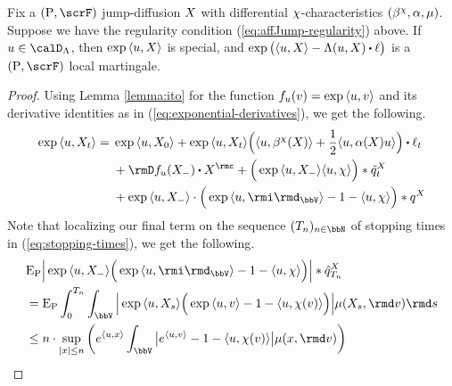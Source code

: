 \begin{proposition}
  \label{proposition:LK-real}
  Fix a $(\Prb, \scrF)$ jump-diffusion $X$ with differential $\chi$-characteristics $(\beta^\chi, \alpha, \mu)$.
  Suppose we have the regularity condition (\ref{eq:affJump-regularity}) above.
  If $\momentVar \in \odeSpace$, then $\exp{\langle u, X\rangle}$ is special, and $\exp\big( \prj\momentVar\X - \ode(\momentVar, \X) \shortInt \leb \big)$ is a $(\Prb, \scrF)$ local martingale.
\end{proposition}
\begin{proof}
  \label{proposition:LK-real}
  Using Lemma \ref{lemma:ito} for the function $f_u(v) = \exp{\langle u, v\rangle}$ and its derivative identities as in (\ref{eq:exponential-derivatives}), we get the following.
  \begin{equation}
    \label{eq:LK-ito-pause}
    \exp\prj{\momentVar}{\X_t}
    = \begin{aligned}[t]
      &\exp\prj{\momentVar}{\X_0} + \exp\prj{\momentVar}{\X_t} \Big( \prj{\momentVar}{\affDrift^\trunc(\X)} + \frac12 \prj{\momentVar}{\affDiff(\X)\momentVar} \Big) \shortInt \leb_t \\
      &+ \Der f_\momentVar(\X_-) \shortInt \X^\rmc + \Big( \exp\prj{\momentVar}{\X_-} \prj{\momentVar}{\trunc} \Big) \ast \compensate{\jumpMeas^\X}_t \\
      &+ \exp\prj{\momentVar}{\X_-} \cdot \Big( \exp\prj{\momentVar}{\id_\vecSpace} - 1 - \prj{\momentVar}{\trunc} \Big) \ast \jumpMeas^\X
    \end{aligned}
  \end{equation}
  Note that localizing our final term on the sequence $(T_n)_{n\in\bbN}$ of stopping times in (\ref{eq:stopping-times}), we get the following.
  \begin{align*}
    &\Exp_\Prb  \Big| \exp\prj{\momentVar}{\X_-} \Big( \exp\prj{\momentVar}{\id_\vecSpace} - 1 - \prj{\momentVar}{\trunc} \Big) \Big| \ast \predproj{\jumpMeas^\X}_{T_n} \\
    &= \Exp_\Prb \int_0^{T_n} \int_\vecSpace \Big| \exp\prj{\momentVar}{\X_s} \Big( \exp\prj{\momentVar}{\markVar} - 1 - \prj{\momentVar}{\trunc(\markVar)} \Big) \Big| \affJump(\X_s, \rmd\markVar) \rmd s \\
    &\leq n \cdot \sup_{|\stateVar|\leq n} \bigg( e^\prj\momentVar\stateVar \int_\vecSpace \big| e^\prj{\momentVar}{\markVar} - 1 - \prj{\momentVar}{\trunc(\markVar)} \big| \affJump(\stateVar, \rmd\markVar) \bigg)
  \end{align*}

\end{proof}
